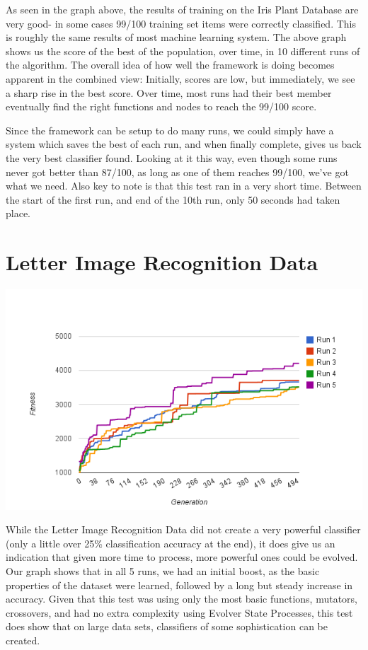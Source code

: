\documentclass[a4paper,11pt]{report}
\begin{document}
As seen in the graph above, the results of training on the Iris Plant Database are very good- in some cases 99/100 training set items were 
correctly classified. This is roughly the same results of most machine learning system. The above graph 
shows us the score of the best of the population, over time, in 10 different runs of the algorithm. The overall 
idea of how well the framework is doing becomes apparent in the combined view: Initially, scores are low, but 
immediately, we see a sharp rise in the best score. Over time, most runs had their best member eventually find 
the right functions and nodes to reach the 99/100 score. 

Since the framework can be setup to do many runs, we could simply have a system which saves the best of each run, 
and when finally complete, gives us back the very best classifier found. Looking at it this way, even though some 
runs never got better than 87/100, as long as one of them reaches 99/100, we've got what we need. Also key to note 
is that this test ran in a very short time. Between the start of the first run, and end of the 10th run, only 50 
seconds had taken place. 

\section{Letter Image Recognition Data}

\begin{center}
 \includegraphics[width=400pt,keepaspectratio=true]{./Report/Letters-Chart.png}
\end{center}

While the Letter Image Recognition Data did not create a very powerful classifier (only a little over 25\% 
classification accuracy at the end), it does give us an indication that given more time to process, more powerful
ones could be evolved. Our graph shows that in all 5 runs, we had an initial boost, as the basic properties of 
the dataset were learned, followed by a long but steady increase in accuracy. Given that this test was 
using only the most basic functions, mutators, crossovers, and had no extra complexity using Evolver State Processes, 
this test does show that on large data sets, classifiers of some sophistication can be created. 
\end{document}
